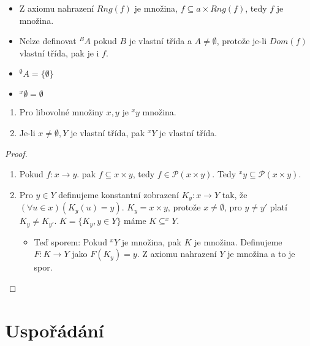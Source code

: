\begin{pozn}
	\begin{itemize}
		\item Z axiomu nahrazení $Rng(f)$ je množina, $f \subseteq a \times Rng(f)$, tedy $f$ je množina.
		\item Nelze definovat $^{B}A$ pokud $B$ je vlastní třída a $A \neq \emptyset$, protože je-li $Dom(f)$ vlastní třída, pak je i $f$.
		\item $^{\emptyset}A = \{\emptyset\}$
		\item $^{x}\emptyset = \emptyset$
	\end{itemize}
\end{pozn}

\begin{lemma}
	\begin{enumerate}
		\item Pro libovolné množiny $x,y$ je $^{x}y$ množina.
		\item Je-li $x \neq \emptyset, Y$ je vlastní třída, pak $^{x}Y$ je vlastní třída.
	\end{enumerate}
\end{lemma}

\begin{proof}
	\begin{enumerate}
		\item Pokud $f: x \to y$. pak $f \subseteq x \times y$, tedy $f \in \mathcal{P}(x \times y)$. Tedy $^{x}y \subseteq \mathcal{P}(x \times y)$.
		\item Pro $y \in Y$ definujeme konstantní zobrazení $K_{y}: x \to Y$ tak, že $(\forall u \in x)(K_{y}(u) = y)$. $K_{y} = x \times {y}$, protože $x \neq \emptyset$, pro $y \neq y'$ platí $K_{y} \neq K_{y'}$. $K = \{K_{y}, y \in Y\}$ máme $K \subseteq ^{x}Y$.
		\begin{itemize}
			\item Teď sporem: Pokud $^{x}Y$ je množina, pak $K$ je množina. Definujeme $F: K \to Y$ jako $F(K_{y})=y$. Z axiomu nahrazení $Y$ je množina a to je spor.
		\end{itemize}
	\end{enumerate}
\end{proof}

\section{Uspořádání}

